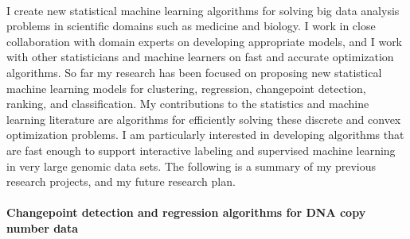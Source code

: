 \documentclass{article}
\begin{document}
\mbox{ }




I create new statistical machine learning algorithms for solving big
data analysis problems in scientific domains such as medicine and
biology. I work in close collaboration with domain experts on
developing appropriate models, and I work with other statisticians and
machine learners on fast and accurate optimization algorithms. So far
my research has been focused on proposing new statistical machine
learning models for clustering, regression, changepoint detection,
ranking, and classification. My contributions to the statistics and
machine learning literature are algorithms for efficiently solving
these discrete and convex optimization problems. I am particularly
interested in developing algorithms that are fast enough to support
interactive labeling and supervised machine learning in very large
genomic data sets. The following is a summary of my previous research
projects, and my future research plan.

\paragraph{Changepoint detection and regression algorithms for DNA copy
  number data}
\end{document}
